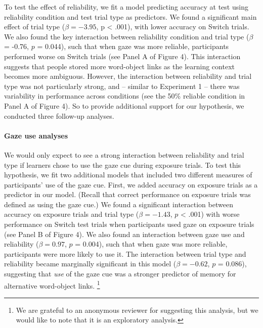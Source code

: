 \documentclass[authoryear, review]{elsarticle}
\begin{document}
To test the effect of reliability, we fit a model predicting accuracy at
test using reliability condition and test trial type as predictors. We
found a significant main effect of trial type (\(\beta = -3.95\), p
\textless{} .001), with lower accuracy on Switch trials. We also found
the key interaction between reliability condition and trial type
(\(\beta\) = -0.76, \(p\) = 0.044), such that when gaze was more
reliable, participants performed worse on Switch trials (see Panel A of
Figure 4). This interaction suggests that people stored more word-object
links as the learning context becomes more ambiguous. However, the
interaction between reliability and trial type was not particularly
strong, and -- similar to Experiment 1 -- there was variability in
performance across conditions (see the 50\% reliable condition in Panel
A of Figure 4). So to provide additional support for our hypothesis, we
conducted three follow-up analyses.

\paragraph{Gaze use analyses}\label{gaze-use-analyses}

We would only expect to see a strong interaction between reliability and
trial type if learners chose to use the gaze cue during exposure trials.
To test this hypothesis, we fit two additional models that included two
different measures of participants' use of the gaze cue. First, we added
accuracy on exposure trials as a predictor in our model. (Recall that
correct performance on exposure trials was defined as using the gaze
cue.) We found a significant interaction between accuracy on exposure
trials and trial type (\(\beta = -1.43\), \(p\) \textless{} .001) with
worse performance on Switch test trials when participants used gaze on
exposure trials (see Panel B of Figure 4). We also found an interaction
between gaze use and reliability (\(\beta = 0.97\), \(p\) = 0.004), such
that when gaze was more reliable, participants were more likely to use
it. The interaction between trial type and reliability became marginally
significant in this model (\(\beta = -0.62\), \(p\) = 0.086), suggesting
that \emph{use} of the gaze cue was a stronger predictor of memory for
alternative word-object links.
\footnote{We are grateful to an anonymous reviewer for suggesting this analysis, but we would like to note that it is an exploratory analysis.}
\end{document}
